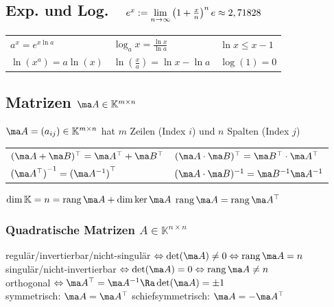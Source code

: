\documentclass[english]{latex4ei/latex4ei_sheet}
\DeclareMathOperator{\rang}{rang}
\begin{document}
\begin{sectionbox}
	\subsection[Exp. und Log.]{Exp. und Log.\ \ $e^x := \lim\limits_{n \rightarrow \infty} \left( 1 + \frac{x}{n} \right)^n \hfill e \approx 2,71828$}
	\begin{tabular*}{\columnwidth}{@{\extracolsep\fill}lll@{}}
		$a^x = e^{x \ln a}$ & $\log_a x = \frac{\ln x}{\ln a}$ & $\ln x \le x -1$\\
		$\ln(x^{a}) = a \ln(x)$ & $\ln(\frac{x}{a}) = \ln x - \ln a$ & $\log(1) = 0$\\
	\end{tabular*}
\end{sectionbox}


\begin{sectionbox}
	\subsection[Matrizen]{Matrizen $\ma A \in\mathbb{K}^{m \times n}$}
	$\ma A=(a_{ij}) \in \mathbb K^{m\times n}$ hat $m$ Zeilen (Index $i$) und $n$ Spalten (Index $j$)
	\begin{tabular*}{\columnwidth}{ll}
	$(\ma A + \ma B)^\top = \ma A^\top + \ma B^\top$ & $(\ma A \cdot \ma B)^\top = \ma B^\top \cdot \ma A^\top$\\
	${(\ma A^\top)}^{-1} = {(\ma A^{-1})}^\top$ & $(\ma A \cdot \ma B)^{-1} = \ma B^{-1}\ma A^{-1}$
	\end{tabular*}
	$\dim \mathbb K = n = \rang\ma A + \dim\ker\ma A$ \qquad $\rang\ma A = \rang\ma A^\top$


	\subsubsection{Quadratische Matrizen $A \in \mathbb{K}^{n \times n}$}
	regulär/invertierbar/nicht-singulär $\Leftrightarrow \det (\ma A) \ne 0 \Leftrightarrow \rang\ma A = n$\\
	singulär/nicht-invertierbar $\Leftrightarrow \det (\ma A) = 0 \Leftrightarrow \rang\ma A \ne n$\\
	orthogonal $\Leftrightarrow \ma A^\top=\ma A^{-1} \Ra \det(\ma A) = \pm 1$\\
	symmetrisch: $\ma A=\ma A^\top$ \qquad schiefsymmetrisch: $\ma A=-\ma A^\top$
	


\end{sectionbox}
\end{document}
